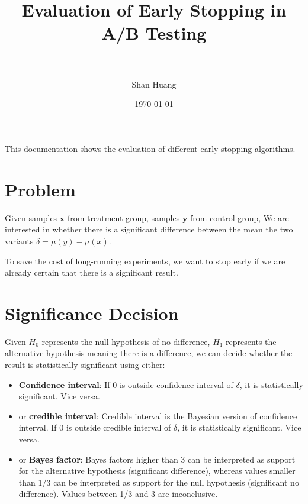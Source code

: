 \documentclass[paper=a4, fontsize=11pt]{scrartcl} %
\title{	
\normalfont \normalsize 
\textsc{} \\ [25pt] %
\horrule{0.5pt} \\[0.4cm] %
\huge Evaluation of Early Stopping in A/B Testing  \\ %
\horrule{2pt} \\[0.5cm] %
}
\author{Shan Huang} %
\date{\normalsize\today} %
\numberwithin{equation}{section} %
\numberwithin{figure}{section} %
\numberwithin{table}{section} %
\begin{document}
\maketitle %


This documentation shows the evaluation of different early stopping algorithms. 

\section{Problem}
Given samples $\textbf{x}$ from treatment group, samples $\textbf{y}$ from control group, We are interested in whether there is a significant difference  between the mean the two variants $\delta = \mu(y)-\mu(x)$.

To save the cost of long-running experiments, we want to stop early if we are already certain that there is a significant result.

\section{Significance Decision}
\label{sec:byt}
Given $H_0$ represents the null hypothesis of no difference, $H_1$ represents the alternative hypothesis meaning there is a difference, we can decide whether the result is statistically significant using either:

\begin{itemize}  
\item \textbf{Confidence interval}: If 0 is outside confidence interval of $\delta$, it is statistically significant. Vice versa.
\item or \textbf{credible interval}: Credible interval is the Bayesian version of confidence interval. If 0 is outside credible interval of $\delta$, it is statistically significant. Vice versa.
\item or \textbf{Bayes factor}: Bayes factors higher than 3 can be interpreted as support for the alternative hypothesis (significant difference), whereas values smaller than 1/3 can be interpreted as support for the null hypothesis (significant no difference). Values between 1/3 and 3 are inconclusive. 
\end{itemize}
\end{document}
